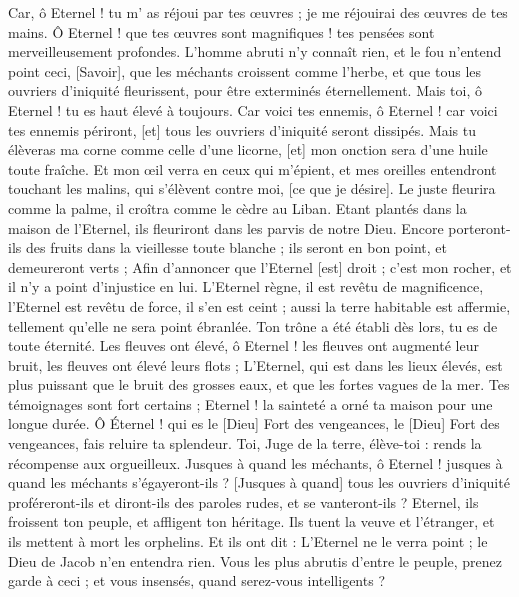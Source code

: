 \begin{multicols}{2}
Car, ô Eternel ! tu m' as réjoui par tes œuvres ; je me réjouirai des œuvres de tes mains.
Ô Eternel ! que tes œuvres sont magnifiques ! tes pensées sont merveilleusement profondes.
L'homme abruti n'y connaît rien, et le fou n'entend point ceci,
[Savoir], que les méchants croissent comme l'herbe, et que tous les ouvriers d'iniquité fleurissent, pour être exterminés éternellement.
Mais toi, ô Eternel ! tu es haut élevé à toujours.
Car voici tes ennemis, ô Eternel ! car voici tes ennemis périront, [et] tous les ouvriers d'iniquité seront dissipés.
Mais tu élèveras ma corne comme celle d'une licorne, [et] mon onction sera d'une huile toute fraîche.
Et mon œil verra en ceux qui m'épient, et mes oreilles entendront touchant les malins, qui s'élèvent contre moi, [ce que je désire].
Le juste fleurira comme la palme, il croîtra comme le cèdre au Liban.
Etant plantés dans la maison de l'Eternel, ils fleuriront dans les parvis de notre Dieu.
Encore porteront-ils des fruits dans la vieillesse toute blanche ; ils seront en bon point, et demeureront verts ;
Afin d'annoncer que l'Eternel [est] droit ; c’est mon rocher, et il n'y a point d'injustice en lui.
\VerseOne{}L'Eternel règne, il est revêtu de magnificence, l'Eternel est revêtu de force, il s'en est ceint ; aussi la terre habitable est affermie, tellement qu'elle ne sera point ébranlée.
Ton trône a été établi dès lors, tu es de toute éternité.
Les fleuves ont élevé, ô Eternel ! les fleuves ont augmenté leur bruit, les fleuves ont élevé leurs flots ;
L'Eternel, qui est dans les lieux élevés, est plus puissant que le bruit des grosses eaux, et que les fortes vagues de la mer.
Tes témoignages sont fort certains ; Eternel ! la sainteté a orné ta maison pour une longue durée.
\VerseOne{}Ô Éternel ! qui es le [Dieu] Fort des vengeances, le [Dieu] Fort des vengeances, fais reluire ta splendeur.
Toi, Juge de la terre, élève-toi : rends la récompense aux orgueilleux.
Jusques à quand les méchants, ô Eternel ! jusques à quand les méchants s'égayeront-ils ?
[Jusques à quand] tous les ouvriers d'iniquité proféreront-ils et diront-ils des paroles rudes, et se vanteront-ils ?
Eternel, ils froissent ton peuple, et affligent ton héritage.
Ils tuent la veuve et l'étranger, et ils mettent à mort les orphelins.
Et ils ont dit : L'Eternel ne le verra point ; le Dieu de Jacob n'en entendra rien.
Vous les plus abrutis d'entre le peuple, prenez garde à ceci ; et vous insensés, quand serez-vous intelligents ?

\end{multicols}
